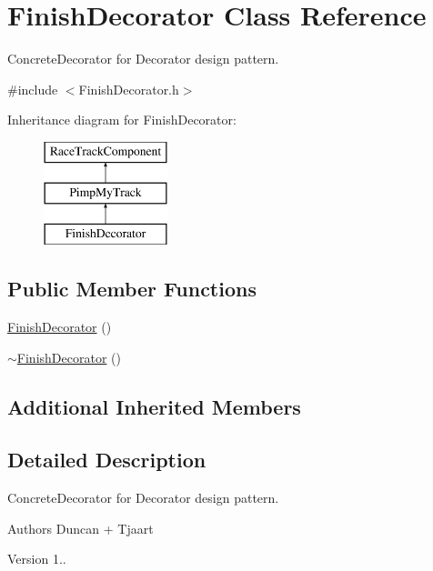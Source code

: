 \hypertarget{class_finish_decorator}{}\section{Finish\+Decorator Class Reference}
\label{class_finish_decorator}


Concrete\+Decorator for Decorator design pattern.  




{\ttfamily \#include $<$Finish\+Decorator.\+h$>$}

Inheritance diagram for Finish\+Decorator\+:\begin{figure}[H]
\begin{center}
\leavevmode
\includegraphics[height=3.000000cm]{class_finish_decorator}
\end{center}
\end{figure}
\subsection*{Public Member Functions}
\begin{DoxyCompactItemize}
\item 
\mbox{\hyperlink{class_finish_decorator_a4f91e93aa36b9094d46361617cc64cc7}{Finish\+Decorator}} ()
\item 
\mbox{\hyperlink{class_finish_decorator_adfb208ad602dff987414885cfbaec66b}{$\sim$\+Finish\+Decorator}} ()
\end{DoxyCompactItemize}
\subsection*{Additional Inherited Members}


\subsection{Detailed Description}
Concrete\+Decorator for Decorator design pattern. 

\begin{DoxyAuthor}{Authors}
Duncan + Tjaart 
\end{DoxyAuthor}
\begin{DoxyVersion}{Version}
1.. 
\end{DoxyVersion}


